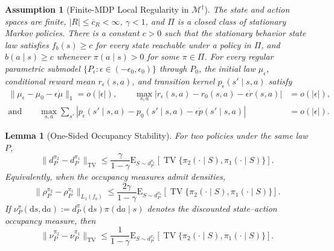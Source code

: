 \documentclass[10pt,a4paper]{amsart}
\newtheorem{assumption}{Assumption}
\newtheorem{lemma}{Lemma}
\newcommand{\E}{\mathrm{E}}
\begin{document}
\begin{assumption}[Finite-MDP Local Regularity in
$\mathcal M^\dagger$]\label{ass:regularity}
    The state and action spaces are finite,
    $|R|\leq\overline c_R<\infty$, $\gamma<1$, and $\Pi$ is a closed
    class of stationary
    Markov policies.  There is a constant $c>0$ such that the
    stationary behavior state law satisfies $f_b(s)\geq c$ for every
    state reachable under a policy in $\Pi$, and
    $b(a\mid s)\geq c$ whenever $\pi(a\mid s)>0$ for some
    $\pi\in\Pi$.
    For every regular parametric submodel
    $\{P_\epsilon:\epsilon\in(-\epsilon_0,\epsilon_0)\}$ through $P_0$,
    the initial law $\mu_\epsilon$, conditional reward mean
    $r_\epsilon(s,a)$, and transition kernel
    $p_\epsilon(s'\mid s,a)$ satisfy
    \[
        \begin{aligned}
        \|\mu_\epsilon-\mu_0-\epsilon\dot\mu\|_1
        =o(|\epsilon|),\qquad
        \max_{s,a}|r_\epsilon(s,a)-r_0(s,a)
        -\epsilon\dot r(s,a)|
        & =o(|\epsilon|),\\
        \text{and} \qquad \max_{s,a}\sum_{s'}
        |p_\epsilon(s'\mid s,a)-p_0(s'\mid s,a)
        -\epsilon\dot p(s'\mid s,a)|
        &=o(|\epsilon|).
        \end{aligned}
    \]
\end{assumption}

\begin{lemma}[One-Sided Occupancy Stability]
\label{lem:diff_polcies_upper}
    For two policies under the same law $P$,
    \[
        \|d_P^{\pi_2}-d_P^{\pi_1}\|_{\mathrm{TV}}
        \leq
        \frac{\gamma}{1-\gamma}
        \E_{S\sim d_P^{\pi_1}}
        \!\left[\operatorname{TV}
        \{\pi_2(\cdot\mid S),\pi_1(\cdot\mid S)\}\right].
    \]
    Equivalently, when the occupancy measures admit densities,
    \[
        \|\rho_P^{\pi_2}-\rho_P^{\pi_1}\|_{L_1(f_b)}
        \leq
        \frac{2\gamma}{1-\gamma}
        \E_{S\sim d_P^{\pi_1}}
        \!\left[\operatorname{TV}
        \{\pi_2(\cdot\mid S),\pi_1(\cdot\mid S)\}\right].
    \]
    If $\nu_P^\pi(\mathrm ds,\mathrm da)
    :=d_P^\pi(\mathrm ds)\pi(\mathrm da\mid s)$ denotes the discounted
    state--action occupancy measure, then
    \[
        \|\nu_P^{\pi_2}-\nu_P^{\pi_1}\|_{\mathrm{TV}}
        \leq
        \frac{1}{1-\gamma}
        \E_{S\sim d_P^{\pi_1}}
        \!\left[\operatorname{TV}
        \{\pi_2(\cdot\mid S),\pi_1(\cdot\mid S)\}\right].
    \]
\end{lemma}
\end{document}
